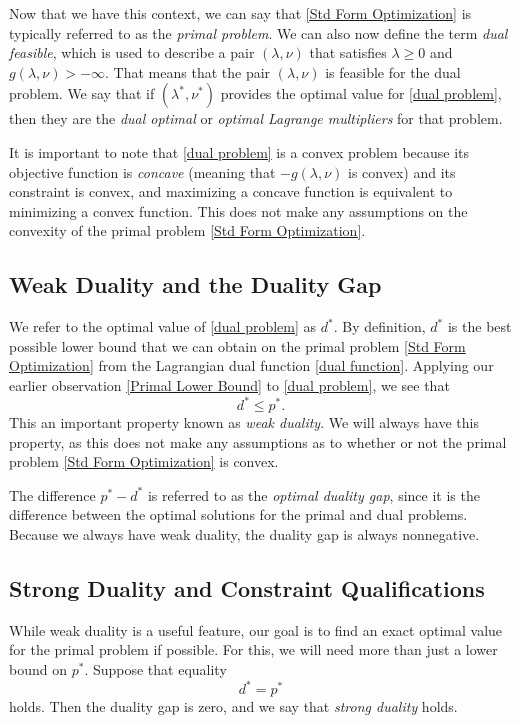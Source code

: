 	Now that we have this context, we can say that \eqref{Std Form Optimization} is typically referred to as the \emph{primal problem}. We can also now define the term \emph{dual feasible}, which is used to describe a pair $(\lambda, \nu)$ that satisfies $\lambda \geq 0$ and $g( \lambda, \nu) > - \infty$. That means that the pair $(\lambda, \nu)$ is feasible for the dual problem. We say that if $(\lambda^* , \nu^*)$ provides the optimal value for \eqref{dual problem}, then they are the \emph{dual optimal} or \emph{optimal Lagrange multipliers} for that problem.
	
	It is important to note that \eqref{dual problem} is a convex problem because its objective function is \emph{concave} (meaning that $-g(\lambda, \nu)$ is convex) and its constraint is convex, and maximizing a concave function is equivalent to minimizing a convex function. This does not make any assumptions on the convexity of the primal problem \eqref{Std Form Optimization}. 
	
	\subsection{Weak Duality and the Duality Gap}
	 We refer to the optimal value of \eqref{dual problem} as $d^*$. By definition, $d^*$ is the best possible lower bound that we can obtain on the primal problem \eqref{Std Form Optimization} from the Lagrangian dual function \eqref{dual function}. Applying our earlier observation \eqref{Primal Lower Bound} to \eqref{dual problem}, we see that
	\begin{equation} \label{Weak Duality}
		d^* \leq p^*.
	\end{equation}
	This an important property known as \emph{weak duality}. We will always have this property, as this does not make any assumptions as to whether or not the primal problem \eqref{Std Form Optimization} is convex. 
	
	The difference $p^* - d^*$ is referred to as the \emph{optimal duality gap}, since it is the difference between the optimal solutions for the primal and dual problems. Because we always have weak duality, the duality gap is always nonnegative. 
	
	\subsection{Strong Duality and Constraint Qualifications}
	
	While weak duality is a useful feature, our goal is to find an exact optimal value for the primal problem if possible. For this, we will need more than just a lower bound on $p^*$. Suppose that equality 
	\begin{equation} \label{Strong Duality}
		d^* = p^*
	\end{equation}
	holds. Then the duality gap is zero, and we say that \emph{strong duality} holds. 
	
